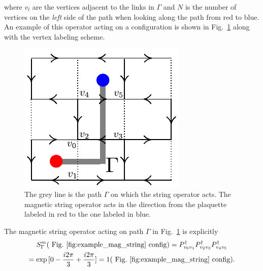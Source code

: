 \documentclass[aps,floatfix,11pt,twocolumn]{revtex4-1}
\begin{document}
            where $v_l$ are the vertices adjacent to the links in $\Gamma$ and $N$ is the number of
            vertices
            on the \textit{left} side of the path when looking along the path from red to blue. 
            An example of this operator acting
            on a configuration is shown in Fig.~\ref{fig:example_mag_string} along with the vertex labeling
            scheme.
            \begin{figure}[htpb]
                \centering
                \includegraphics[width=0.8\linewidth]{example_mag_string.pdf}
                \caption{The grey line is the path $\Gamma$ on which the string operator acts. The magnetic
                    string operator acts in the 
                    direction from the plaquette labeled in red to the one labeled in blue.}
                \label{fig:example_mag_string}
            \end{figure}
            The magnetic string operator acting on path $\Gamma$ in Fig.~\ref{fig:example_mag_string} is
            explicitly
            \begin{multline}
                S^m_{\Gamma} (\mathrm{~Fig.~\ref{fig:example_mag_string}~config})
                = P_{v_0v_1}^\dagger P_{v_2v_3}^\dagger P_{v_4v_5}^\dagger
                \\
                = \exp{[0 - \frac{i2\pi}{3} + \frac{i2\pi}{3} ]} 
                = 1 (\mathrm{~Fig.~\ref{fig:example_mag_string}~config})
                .
            \end{multline}
\end{document}
